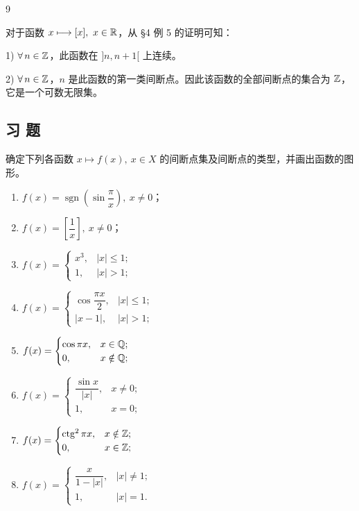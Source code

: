 \begin{sourceexample}{9}

	对于函数 \(x\longmapsto[x],\ x\in\R\)，从 \S4 例 5 的证明可知：

	1) \(\forall\,n\in\mathbb{Z}\)，此函数在 \(]n,n+1[\) 上连续。

	2) \(\forall\,n\in\mathbb{Z}\)，\(n\) 是此函数的第一类间断点。因此该函数的全部间断点的集合为 \(\mathbb{Z}\)，它是一个可数无限集。

\end{sourceexample}

\subsection*{习 题}

\begin{exercise}
	\item 确定下列各函数 \(x\longmapsto f(x),\ x\in X\) 的间断点集及间断点的类型，并画出函数的图形。
	\begin{enumerate}[label=\arabic*)]
		\item \(f(x)=\operatorname{sgn}\left(\sin\dfrac\pi x\right),\ x\neq0\)；
		\item \(f(x)=\left[\dfrac1x\right],\ x\neq0\)；
		\item \(f(x)=\begin{cases} x^3, & |x|\le1; \\ 1, & |x|>1; \end{cases}\)
		\item \(f(x)=\begin{cases} \cos\dfrac{\pi x}{2}, & |x|\le1; \\ |x-1|, & |x|>1; \end{cases}\)
		\item \(f(x)=\begin{cases} \cos\pi x, & x\in\mathbb{Q}; \\ 0, & x\notin\mathbb{Q}; \end{cases}\)
		\item \(f(x)=\begin{cases} \dfrac{\sin x}{|x|}, & x\neq0; \\ 1, & x=0; \end{cases}\)
		\item \(f(x)=\begin{cases} \operatorname{ctg}^2\pi x, & x\notin\mathbb{Z}; \\ 0, & x\in\mathbb{Z}; \end{cases}\)
		\item \(f(x)=\begin{cases} \dfrac{x}{1-|x|}, & |x|\neq1; \\ 1, & |x|=1. \end{cases}\)
	\end{enumerate}
\end{exercise}

